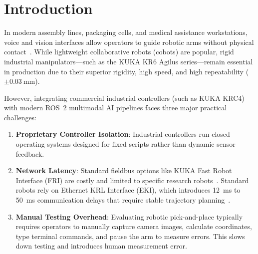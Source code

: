 \documentclass[runningheads]{llncs}
\begin{document}
\section{Introduction}
\label{sec:introduction}

In modern assembly lines, packaging cells, and medical assistance workstations, voice and vision interfaces allow operators to guide robotic arms without physical contact~\cite{quirubot2016,schafer2023smart}. While lightweight collaborative robots (cobots) are popular, rigid industrial manipulators—such as the KUKA KR6 Agilus series—remain essential in production due to their superior rigidity, high speed, and high repeatability ($\pm\SI{0.03}{\milli\meter}$).

However, integrating commercial industrial controllers (such as KUKA KRC4) with modern ROS~2 multimodal AI pipelines faces three major practical challenges:
\begin{enumerate}
    \item \textbf{Proprietary Controller Isolation}: Industrial controllers run closed operating systems designed for fixed scripts rather than dynamic sensor feedback.
    \item \textbf{Network Latency}: Standard fieldbus options like KUKA Fast Robot Interface (FRI) are costly and limited to specific research robots~\cite{lbr_stack2024}. Standard robots rely on Ethernet KRL Interface (EKI), which introduces \SI{12}{\milli\second} to \SI{50}{\milli\second} communication delays that require stable trajectory planning~\cite{kuka_eki_eval2022}.
    \item \textbf{Manual Testing Overhead}: Evaluating robotic pick-and-place typically requires operators to manually capture camera images, calculate coordinates, type terminal commands, and pause the arm to measure errors. This slows down testing and introduces human measurement error.
\end{enumerate}
\end{document}
